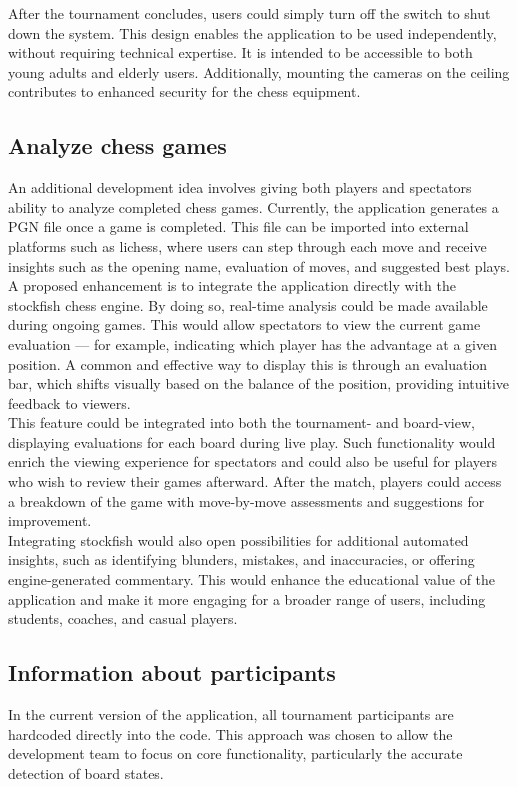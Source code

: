 After the tournament concludes, users could simply turn off the switch to shut down the system. This design enables the application to be used independently, without requiring technical expertise. It is intended to be accessible to both young adults and elderly users. Additionally, mounting the cameras on the ceiling contributes to enhanced security for the chess equipment.

\subsection{Analyze chess games}
An additional development idea involves giving both players and spectators ability to analyze completed chess games. Currently, the application generates a \gls{PGN} file once a game is completed. This file can be imported into external platforms such as \gls{lichess}, where users can step through each move and receive insights such as the opening name, evaluation of moves, and suggested best plays. \\

A proposed enhancement is to integrate the application directly with the \gls{stockfish} chess engine. By doing so, real-time analysis could be made available during ongoing games. This would allow spectators to view the current game evaluation — for example, indicating which player has the advantage at a given position. A common and effective way to display this is through an evaluation bar, which shifts visually based on the balance of the position, providing intuitive feedback to viewers. \\

This feature could be integrated into both the tournament- and board-view, displaying evaluations for each board during live play. Such functionality would enrich the viewing experience for spectators and could also be useful for players who wish to review their games afterward. After the match, players could access a breakdown of the game with move-by-move assessments and suggestions for improvement. \\

Integrating \gls{stockfish} would also open possibilities for additional automated insights, such as identifying blunders, mistakes, and inaccuracies, or offering engine-generated commentary. This would enhance the educational value of the application and make it more engaging for a broader range of users, including students, coaches, and casual players.

\subsection{Information about participants}
In the current version of the application, all tournament participants are hardcoded directly into the code. This approach was chosen to allow the development team to focus on core functionality, particularly the accurate detection of board states. \\

